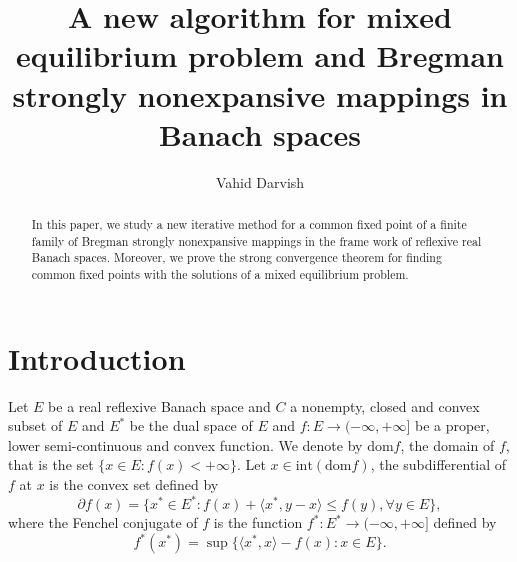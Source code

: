 \documentclass[reqno,b5paper]{amsart}
\theoremstyle{plain}
\theoremstyle{definition}
\numberwithin{equation}{section}
\numberwithin{equation}{section}
\begin{document}
\title[A new algorithm for mixed equilibrium problem]{A new algorithm for mixed equilibrium problem and Bregman strongly nonexpansive mappings in Banach spaces}
\author[Vahid Darvish]{Vahid Darvish}

\address{Department of Mathematics and Computer Science\\
Amirkabir University of Technology\\
Hafez Ave., P.O. Box 15875-4413\\Tehran, Iran.} 


\begin{abstract}
In this paper, we study a new iterative method for a common fixed point of a finite family of Bregman strongly nonexpansive mappings in the frame work of reflexive real Banach spaces. Moreover, we prove the strong convergence theorem for finding common fixed points with the solutions of a mixed equilibrium problem.
\end{abstract}

\maketitle

\section{Introduction}
Let $E$ be a real reflexive Banach space and $C$ a nonempty, closed and convex subset of $E$ and  $E^{*}$ be the dual space of $E$ and $f:E\to (-\infty,+\infty]$ be a proper, lower semi-continuous and convex function. We denote by $\text{dom} f$, the domain of $f$, that is the set $\{x\in E : f(x)<+\infty\}$. Let $x\in \text{int}(\text{dom} f)$, the subdifferential  of $f$ at $x$ is the convex set defined by 
\begin{equation*}
\partial f(x)=\{x^{*}\in E^{*} : f(x)+\langle x^{*},y-x\rangle \leq f(y), \forall y\in E\},
\end{equation*}
where the Fenchel conjugate of $f$ is the function $f^{*}: E^{*}\to (-\infty,+\infty]$ defined by 
$$f^{*}(x^{*})=\sup \{\langle x^{*},x\rangle -f(x): x\in E\}.$$
\end{document}
